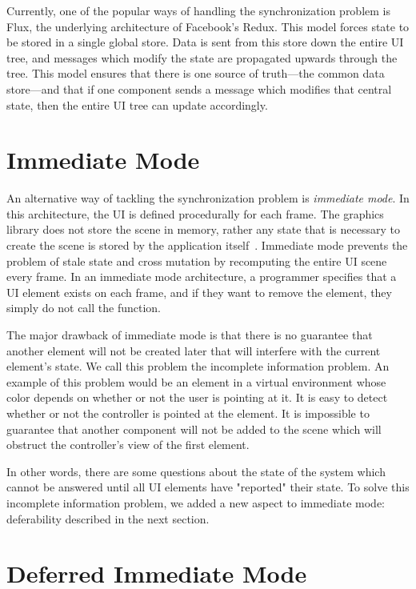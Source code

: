 \documentclass[conference,12pt]{IEEEtran}
\begin{document}
Currently, one of the popular ways of handling the synchronization problem is
Flux, the underlying architecture of Facebook's Redux. This model forces state
to be stored in a single global store. Data is sent from this store down the
entire UI tree, and messages which modify the state are propagated upwards
through the tree. This model ensures that there is one source of truth---the
common data store---and that if one component sends a message which modifies
that central state, then the entire UI tree can update accordingly.

\section{Immediate Mode}\label{sec:immediate-mode}

An alternative way of tackling the synchronization problem is \textit{immediate
mode}.  In this architecture, the UI is defined procedurally for each frame. The
graphics library does not store the scene in memory, rather any state that is
necessary to create the scene is stored by the application
itself~\cite{Microsoft:Retained-vs-Immediate}. Immediate mode prevents the
problem of stale state and cross mutation by recomputing the entire UI scene
every frame. In an immediate mode architecture, a programmer specifies that a UI
element exists on each frame, and if they want to remove the element, they
simply do not call the function.

The major drawback of immediate mode is that there is no guarantee that another
element will not be created later that will interfere with the current element's
state. We call this problem the incomplete information problem. An example of
this problem would be an element in a virtual environment whose color depends on
whether or not the user is pointing at it. It is easy to detect whether or not
the controller is pointed at the element. It is impossible to guarantee that
another component will not be added to the scene which will obstruct the
controller's view of the first element.

In other words, there are some questions about the state of the system which
cannot be answered until all UI elements have "reported" their state.  To solve
this incomplete information problem, we added a new aspect to immediate mode:
deferability described in the next section.

\section{Deferred Immediate Mode}\label{sec:dim}
\end{document}
